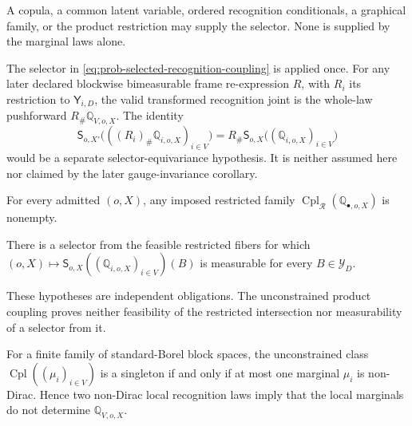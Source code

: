 A copula, a common latent variable, ordered recognition conditionals, a graphical family, or the product restriction may supply the selector. None is supplied by the marginal laws alone.

The selector in \eqref{eq:prob-selected-recognition-coupling} is applied once.
For any later declared blockwise bimeasurable frame re-expression \(R\), with
\(R_i\) its restriction to \(\mathsf Y_{i,D}\), the valid transformed
recognition joint is the whole-law pushforward \(R_\#\mathbb Q_{V,o,X}\).
The identity
\[
\mathsf S_{o,X'}\bigl(((R_i)_\#\mathbb Q_{i,o,X})_{i\in V}\bigr)
=
R_\#\mathsf S_{o,X}\bigl((\mathbb Q_{i,o,X})_{i\in V}\bigr)
\]
would be a separate selector-equivariance hypothesis. It is neither assumed
here nor claimed by the later gauge-invariance corollary.

\medskip
{}
For every admitted $(o,X)$, any imposed restricted family
$\operatorname{Cpl}_{\mathcal R}(\mathbb Q_{\bullet,o,X})$ is nonempty. 
\medskip

There is a selector from the feasible restricted fibers for which
$(o,X)\mapsto\mathsf S_{o,X}((\mathbb Q_{i,o,X})_{i\in V})(B)$ is measurable for every
$B\in\mathscr Y_D$. 
\medskip

These hypotheses are independent obligations. The unconstrained product coupling proves neither
feasibility of the restricted intersection nor measurability of a selector from it.

\medskip
{}
For a finite family of standard-Borel block spaces, the unconstrained class $\operatorname{Cpl}((\mu_i)_{i\in V})$ is a singleton if and only if at most one marginal $\mu_i$ is non-Dirac. Hence two non-Dirac local recognition laws imply that the local marginals do not determine $\mathbb Q_{V,o,X}$. 
\medskip

